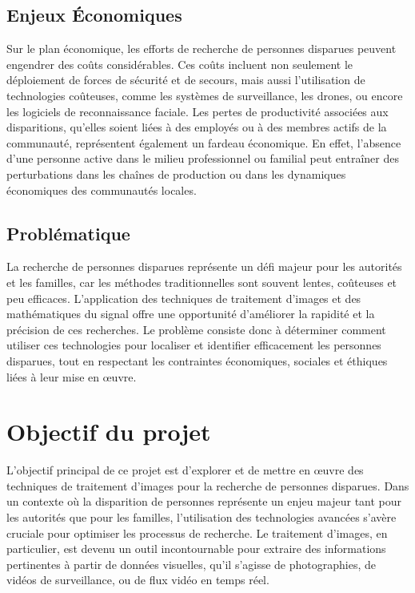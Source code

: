 \documentclass[a4paper,12pt]{report}
\begin{document}
\subsection*{Enjeux Économiques}
Sur le plan économique, les efforts de recherche de personnes disparues peuvent engendrer des coûts considérables. Ces coûts incluent non seulement le déploiement de forces de sécurité et de secours, mais aussi l'utilisation de technologies coûteuses, comme les systèmes de surveillance, les drones, ou encore les logiciels de reconnaissance faciale. Les pertes de productivité associées aux disparitions, qu’elles soient liées à des employés ou à des membres actifs de la communauté, représentent également un fardeau économique. En effet, l'absence d'une personne active dans le milieu professionnel ou familial peut entraîner des perturbations dans les chaînes de production ou dans les dynamiques économiques des communautés locales.

\subsection*{Problématique}
La recherche de personnes disparues représente un défi majeur pour les autorités et les familles, car les méthodes traditionnelles sont souvent lentes, coûteuses et peu efficaces. L'application des techniques de traitement d'images et des mathématiques du signal offre une opportunité d'améliorer la rapidité et la précision de ces recherches. Le problème consiste donc à déterminer comment utiliser ces technologies pour localiser et identifier efficacement les personnes disparues, tout en respectant les contraintes économiques, sociales et éthiques liées à leur mise en œuvre.

\section*{Objectif du projet}
L'objectif principal de ce projet est d'explorer et de mettre en œuvre des techniques de traitement d'images pour la recherche de personnes disparues. Dans un contexte où la disparition de personnes représente un enjeu majeur tant pour les autorités que pour les familles, l'utilisation des technologies avancées s'avère cruciale pour optimiser les processus de recherche. Le traitement d'images, en particulier, est devenu un outil incontournable pour extraire des informations pertinentes à partir de données visuelles, qu'il s'agisse de photographies, de vidéos de surveillance, ou de flux vidéo en temps réel.
\end{document}
